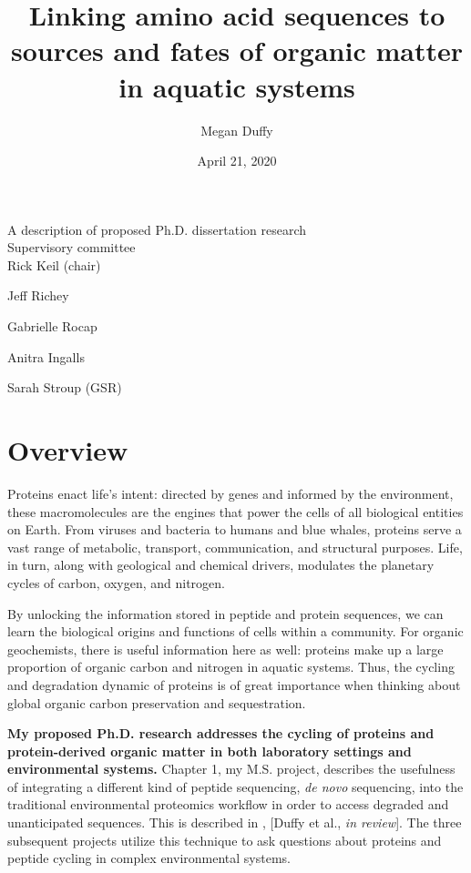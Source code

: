 \documentclass[12pt, letterpaper, twoside]{article}
\title{Linking amino acid sequences to sources and fates of organic matter in aquatic systems}
\author{Megan Duffy}
\date{April 21, 2020}
\begin{document}
	
	\begin{titlepage}
		
		\maketitle
		\begin{center}
			A description of proposed Ph.D. dissertation research \\
			\bigskip
			\bigskip
			Supervisory committee \\
			\bigskip
			Rick Keil (chair) 
			
			Jeff Richey 
			
			Gabrielle Rocap 
			
			Anitra Ingalls 
			
			Sarah Stroup (GSR)
		\end{center}
		
	\end{titlepage}
	

\newpage

\tableofcontents{}

\newpage

\section*{Overview}

Proteins enact life’s intent: directed by genes and informed by the environment, these macromolecules are the engines that power the cells of all biological entities on Earth. From viruses and bacteria to humans and blue whales, proteins serve a vast range of metabolic, transport, communication, and structural purposes. Life, in turn, along with geological and chemical drivers, modulates the planetary cycles of carbon, oxygen, and nitrogen.

By unlocking the information stored in peptide and protein sequences, we can learn the biological origins and functions of cells within a community. For organic geochemists, there is useful information here as well: proteins make up a large proportion of organic carbon and nitrogen in aquatic systems. Thus, the cycling and degradation dynamic of proteins is of great importance when thinking about global organic carbon preservation and sequestration. 

\textbf{My proposed Ph.D. research addresses the cycling of proteins and protein-derived organic matter in both laboratory settings and environmental systems.} Chapter 1, my M.S. project, describes the usefulness of integrating a different kind of peptide sequencing, \textit{de novo} sequencing, into the traditional environmental proteomics workflow in order to access degraded and unanticipated sequences. This is described in , [Duffy et al., \textit{in review}]. The three subsequent projects utilize this technique to ask questions about proteins and peptide cycling in complex environmental systems. 
\end{document}
